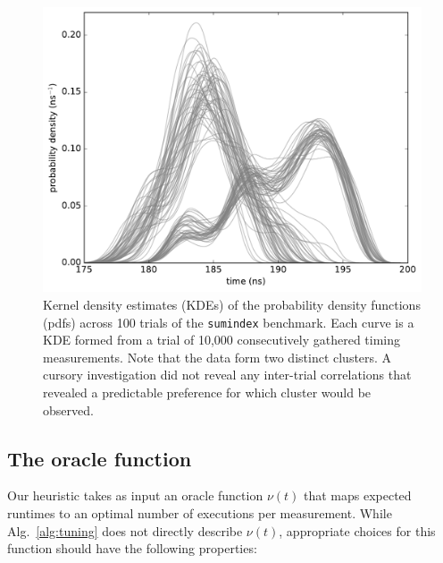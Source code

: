 \documentclass[conference]{IEEEtran}
\begin{document}
\begin{figure}
\centering
\includegraphics[width=\columnwidth]{figures/fig4/kde_pdf_sumindex}
\caption{Kernel density estimates (KDEs) of the probability density functions
(pdfs) across 100 trials of the \lstinline|sumindex| benchmark. Each curve is a
KDE formed from a trial of 10,000 consecutively gathered timing measurements.
Note that the data form two distinct clusters. A cursory investigation did not
reveal any inter-trial correlations that revealed a predictable preference for
which cluster would be observed.}
\label{fig:pdfsumindex}
\end{figure}

\subsection{The oracle function}
\label{sec:oracle}

Our heuristic takes as input an oracle function $\nu(t)$ that maps expected
runtimes to an optimal number of executions per measurement. While
Alg.~\ref{alg:tuning} does not directly describe $\nu(t)$, appropriate choices
for this function should have the following properties:
\end{document}
